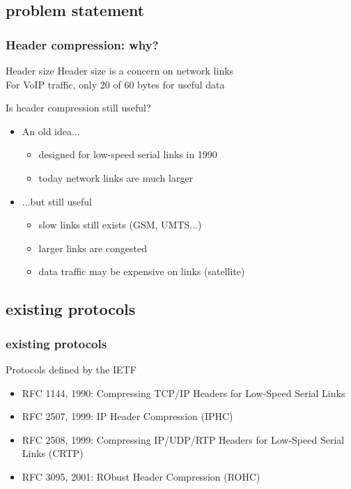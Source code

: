 \documentclass[utf8]{beamer}
\begin{document}
\subsection{problem statement}
\begin{frame}
	\frametitle{Header compression: why?}
	\begin{block}{Header size}
		Header size is a concern on network links\\
		\pause
		For VoIP traffic, only 20 of 60 bytes for useful data
	\end{block}
	\pause
	\begin{block}{Is header compression still useful?}
		\begin{itemize}
			\item An old idea...
				\begin{itemize}
					\item designed for low-speed serial links in 1990
					\item today network links are much larger
				\end{itemize}
			\item ...but still useful
				\begin{itemize}
					\item slow links still exists (GSM, UMTS...)
					\item larger links are congested
					\item data traffic may be expensive on links (satellite)
				\end{itemize}
		\end{itemize}
	\end{block}
\end{frame}

\subsection{existing protocols}
\begin{frame}
	\frametitle{existing protocols}
	\begin{block}{Protocols defined by the IETF}
		\begin{itemize}
			\item RFC 1144, 1990: Compressing TCP/IP Headers for Low-Speed Serial Links
			\item RFC 2507, 1999: IP Header Compression (IPHC)
			\item RFC 2508, 1999: Compressing IP/UDP/RTP Headers for Low-Speed Serial Links (CRTP)
			\item RFC 3095, 2001: RObust Header Compression (ROHC)
		\end{itemize}
	\end{block}
\end{frame}
\end{document}
